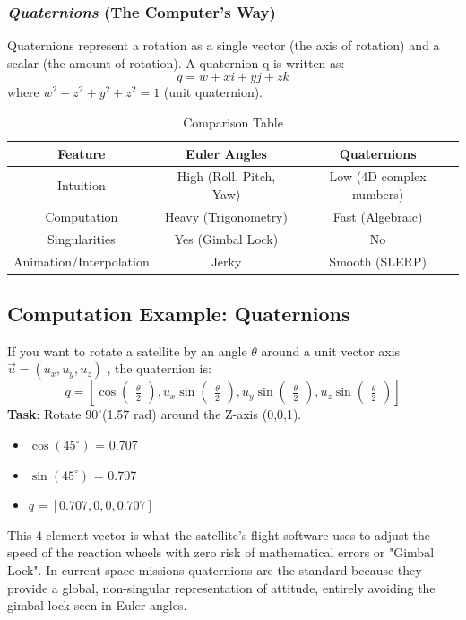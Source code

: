\documentclass[a4paper,10pt]{article}
\begin{document}
\subsubsection{\emph{Quaternions} (The Computer's Way)}
Quaternions represent a rotation as a single vector (the axis of rotation) and a scalar (the amount of rotation). A quaternion q is written as:
\[
 q = w + xi + yj + zk
\]
where \( w^2 + z^2 + y^2 + z^2 = 1 \) (unit quaternion).
\begin{table}[h!]
\begin{center}
\begin{tabular}{|c|c|c|}
\hline
\textbf{Feature}&\textbf{Euler Angles}&\textbf{Quaternions} \\
\hline
Intuition&High (Roll, Pitch, Yaw)&Low (4D complex numbers) \\
\hline
Computation&Heavy (Trigonometry)&Fast (Algebraic) \\
\hline
Singularities&Yes (Gimbal Lock)&No \\
\hline
Animation/Interpolation&Jerky&Smooth (SLERP) \\
\hline
\end{tabular}
\end{center}
\caption{Comparison Table}
\end{table}
\subsection{Computation Example: Quaternions}
If you want to rotate a satellite by an angle \( \theta \) around a unit vector axis \(\vec{u} = (u_x,u_y,u_z) \)
, the quaternion is:
\[
 q = [\cos \begin{pmatrix}\frac{\theta}{2}\end{pmatrix},u_x\sin \begin{pmatrix}\frac{\theta}{2} \end{pmatrix},u_y\sin \begin{pmatrix}\frac{\theta}{2}\end{pmatrix},u_z\sin \begin{pmatrix} \frac{\theta}{2}\end{pmatrix}]
\]
\textbf{Task}: Rotate \( 90^{\circ}\)(1.57 rad) around the Z-axis (0,0,1).
\begin{itemize}
\item \(\cos(45^{\circ})\) = 0.707
\item \(\sin(45^{\circ})\) = 0.707
\item \(q = [0.707, 0, 0, 0.707]\)
\end{itemize}
This 4-element vector is what the satellite's flight software uses to adjust the speed of the reaction wheels with zero risk of mathematical errors or "Gimbal Lock".
In current space missions quaternions are the standard because they provide a global, non-singular representation of attitude, entirely avoiding the gimbal lock seen in Euler angles.
\end{document}
